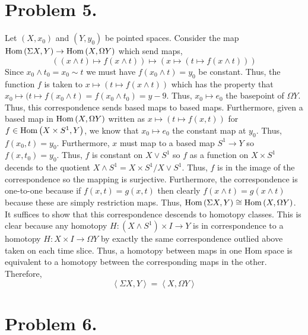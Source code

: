\documentclass[12pt]{extarticle}
\begin{document}
\section*{Problem 5.}
Let $(X, x_0)$ and $(Y, y_0)$ be pointed spaces.
Consider the map $\mathrm{Hom}\left( \Sigma X, Y \right) \to \mathrm{Hom}\left( X, \Omega Y \right)$ which send maps,
\[ ((x \wedge t) \mapsto f(x \wedge t)) \mapsto (x \mapsto ( t \mapsto f(x \wedge t))) \] 
Since $x_0 \wedge t_0 = x_0 \sim t$ we must have $f(x_0 \wedge t) = y_0$ be constant. Thus, the function $f$ is taken to $x \mapsto ( t \mapsto f(x \wedge t))$ which has the property that $x_0 \mapsto (t \mapsto f(x_0 \wedge t) = f(x_0 \wedge t_0) = y-9$. Thus, $x_0 \mapsto e_0$ the basepoint of $\Omega Y$. Thus, this correspondence sends based maps to based maps. Furthermore, given a based map in $\mathrm{Hom}\left( X, \Omega Y \right)$ written as $x \mapsto (t \mapsto f(x, t))$ for $f \in \mathrm{Hom}\left( X \times S^1, Y \right)$, we know that $x_0 \mapsto e_0$ the constant map at $y_0$. Thus, $f(x_0, t) = y_0$. Furthermore, $x$ must map to a based map $S^1 \to Y$ so $f(x, t_0) = y_0$. Thus, $f$ is constant on $X \vee S^1$ so $f$ as a function on $X \times S^1$ decends to the quotient $X \wedge S^1 = X \times S^1 / X \vee S^1$. Thus, $f$ is in the image of the correspondence so the mapping is surjective. Furthermore, the correspondence is one-to-one because if $f(x, t) = g(x, t)$ then clearly  
$f(x \wedge t) = g(x \wedge t)$ because these are simply restriction maps. Thus, $\mathrm{Hom}\left( \Sigma X, Y \right) \cong \mathrm{Hom}\left( X, \Omega Y \right)$. It suffices to show that this correspondence descends to homotopy classes. This is clear because any homotopy $H : (X \wedge S^1) \times I \to Y$ is in correspondence to a homotopy $H : X \times I \to \Omega Y$ by exactly the same correspondence outlied above taken on each time slice. Thus, a homotopy between maps in one Hom space is equivalent to a homotopy between the corresponding maps in the other. Therefore, 
\[ \left< \Sigma X, Y \right> = \left<X, \Omega Y \right> \] 
\section*{Problem 6.}
\end{document}
